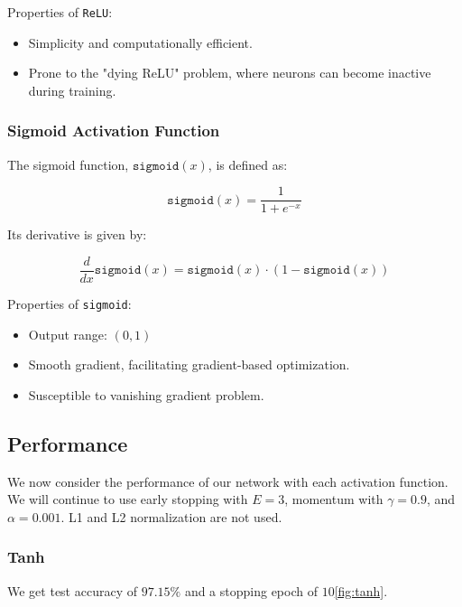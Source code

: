 Properties of \texttt{ReLU}:
\begin{itemize}
	\item Simplicity and computationally efficient.
	\item Prone to the "dying ReLU" problem, where neurons can become inactive during training.
\end{itemize}

\subsubsection{Sigmoid Activation Function}

The sigmoid function, \(\texttt{sigmoid}(x)\), is defined as:

\[
	\texttt{sigmoid}(x) = \frac{1}{1 + e^{-x}}
\]

Its derivative is given by:

\[
	\frac{d}{dx} \texttt{sigmoid}(x) = \texttt{sigmoid}(x) \cdot (1 - \texttt{sigmoid}(x))
\]

Properties of \texttt{sigmoid}:
\begin{itemize}
	\item Output range: \((0, 1)\)
	\item Smooth gradient, facilitating gradient-based optimization.
	\item Susceptible to vanishing gradient problem.
\end{itemize}

\subsection{Performance}

We now consider the performance of our network with each activation function. We will
continue to use early stopping with $E = 3$, momentum with $\gamma = 0.9$, and $\alpha = 0.001$.
L1 and L2 normalization are not used.

\subsubsection{Tanh}

We get test accuracy of $97.15\%$ and a stopping epoch of $10$\cref{fig:tanh}.



